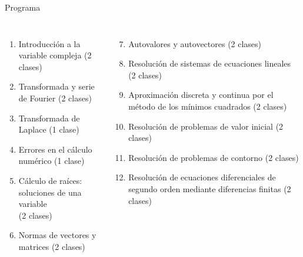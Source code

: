 \documentclass[9pt, aspectratio=169]{beamer}
\begin{document}
\begin{frame}{Programa}
	\begin{columns}[t]
		\cx
		\begin{enumerate}
			\item Introducción a la variable compleja (2 clases)
			\item Transformada y serie de Fourier (2 clases)
			\item Transformada de Laplace (1 clase)
			\item Errores en el cálculo numérico (1 clase)
			\item Cálculo de raíces: soluciones de una variable\\ (2 clases)
			\item Normas de vectores y matrices (2 clases)
		\end{enumerate}
		\cx
		\begin{enumerate}
			\setcounter{enumi}{6}
			\item Autovalores y autovectores (2 clases)
			\item Resolución de sistemas de ecuaciones lineales\\ (2 clases)
			\item Aproximación discreta y continua por el método de los mínimos cuadrados (2 clases)
			\item Resolución de problemas de valor inicial (2 clases)
			\item Resolución de problemas de contorno (2 clases)
			\item Resolución de ecuaciones diferenciales de segundo orden mediante diferencias finitas (2 clases)
		\end{enumerate}
	\end{columns}
	\vspace{1em}
	\begin{columns}[c]
		\cx
		\centering

		\cx
		\centering
	\end{columns}
	\begin{center}
	\end{center}
\end{frame}
\end{document}
